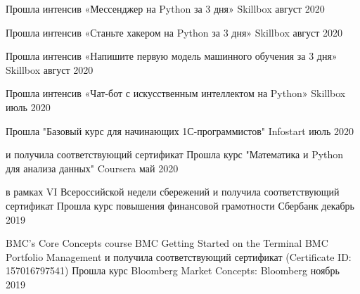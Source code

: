 \documentclass[]{awesome-cv}
\begin{document}
\begin{cventries}
	\cventry
		{}
	{Прошла интенсив «Мессенджер на Python за 3 дня»}
	{Skillbox}
	{август 2020}
	{}
	\end{cventries} \vspace{-5mm}\begin{cventries}
	\cventry
		{}
	{Прошла интенсив «Станьте хакером на Python за 3 дня»}
	{Skillbox}
	{август 2020}
	{}
	\end{cventries} \vspace{-5mm}\begin{cventries}
	\cventry
		{}
	{Прошла интенсив «Напишите первую модель машинного обучения за 3 дня»}
	{Skillbox}
	{август 2020}
	{}
	\end{cventries} \vspace{-5mm}\begin{cventries}
	\cventry
		{}
	{Прошла интенсив «Чат-бот с искусственным интеллектом на Python»}
	{Skillbox}
	{июль 2020}
	{}
	\end{cventries} \vspace{-5mm}\begin{cventries}
	\cventry
		{}
	{Прошла "Базовый курс для начинающих 1С-программистов" }
	{Infostart}
	{июль 2020}
	{}
	\end{cventries} \vspace{-5mm}\begin{cventries}
	\cventry
	{и получила соответствующий сертификат}
	{Прошла курс "Математика и Python для анализа данных" }
	{Coursera}
	{май 2020}
	{}
	\end{cventries} \vspace{-5mm} \begin{cventries}
	\cventry
{в рамках VI Всероссийской недели сбережений и получила соответствующий сертификат}
	{Прошла курс повышения финансовой грамотности}
	{Сбербанк}
	{декабрь 2019}
	{}
	\end{cventries}\vspace{-5mm}  \begin{cventries}
	
	\cventry
		{\quad \bullet BMC's Core Concepts course
	\newline \quad \bullet BMC Getting Started on the Terminal
	\newline \quad \bullet BMC Portfolio Management
	\newline \quad и получила соответствующий сертификат (Certificate ID: 157016797541)}
	{Прошла курс Bloomberg Market Concepts:}
	{Bloomberg}
	{ноябрь 2019}
	{}
	\end{cventries} 
	\vspace{-5mm}
\end{document}

